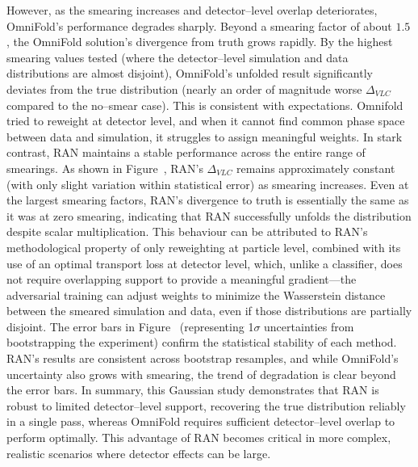         However, as the smearing increases and detector--level overlap deteriorates, OmniFold’s performance degrades sharply.
        Beyond a smearing factor of about $1.5$, the OmniFold solution’s divergence from truth grows rapidly.
        By the highest smearing values tested (where the detector--level simulation and data distributions are almost disjoint), OmniFold’s unfolded result significantly deviates from the true distribution (nearly an order of magnitude worse $\Delta_{VLC}$ compared to the no--smear case).
        This is consistent with expectations.
        Omnifold tried to reweight at detector level, and when it cannot find common phase space between data and simulation, it struggles to assign meaningful weights.
        In stark contrast, RAN maintains a stable performance across the entire range of smearings.
        As shown in Figure~, RAN’s $\Delta_{VLC}$ remains approximately constant (with only slight variation within statistical error) as smearing increases.
        Even at the largest smearing factors, RAN’s divergence to truth is essentially the same as it was at zero smearing, indicating that RAN successfully unfolds the distribution despite scalar multiplication.
        This behaviour can be attributed to RAN’s methodological property of only reweighting at particle level, combined with its use of an optimal transport loss at detector level, which, unlike a classifier, does not require overlapping support to provide a meaningful gradient---the adversarial training can adjust weights to minimize the Wasserstein distance between the smeared simulation and data, even if those distributions are partially disjoint.
        The error bars in Figure~ (representing 1$\sigma$ uncertainties from bootstrapping the experiment) confirm the statistical stability of each method.
        RAN’s results are consistent across bootstrap resamples, and while OmniFold’s uncertainty also grows with smearing, the trend of degradation is clear beyond the error bars.
        In summary, this Gaussian study demonstrates that RAN is robust to limited detector--level support, recovering the true distribution reliably in a single pass, whereas OmniFold requires sufficient detector--level overlap to perform optimally. This advantage of RAN becomes critical in more complex, realistic scenarios where detector effects can be large.
